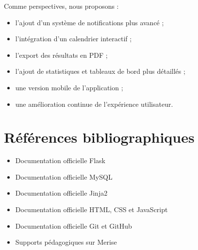 \documentclass[a4paper,12pt,oneside]{report}
\begin{document}
Comme perspectives, nous proposons :
\begin{itemize}
    \item l'ajout d'un système de notifications plus avancé ;
    \item l'intégration d'un calendrier interactif ;
    \item l'export des résultats en PDF ;
    \item l'ajout de statistiques et tableaux de bord plus détaillés ;
    \item une version mobile de l'application ;
    \item une amélioration continue de l'expérience utilisateur.
\end{itemize}

\chapter*{Références bibliographiques}

\begin{itemize}
    \item Documentation officielle Flask
    \item Documentation officielle MySQL
    \item Documentation officielle Jinja2
    \item Documentation officielle HTML, CSS et JavaScript
    \item Documentation officielle Git et GitHub
    \item Supports pédagogiques sur Merise
\end{itemize}
\end{document}
